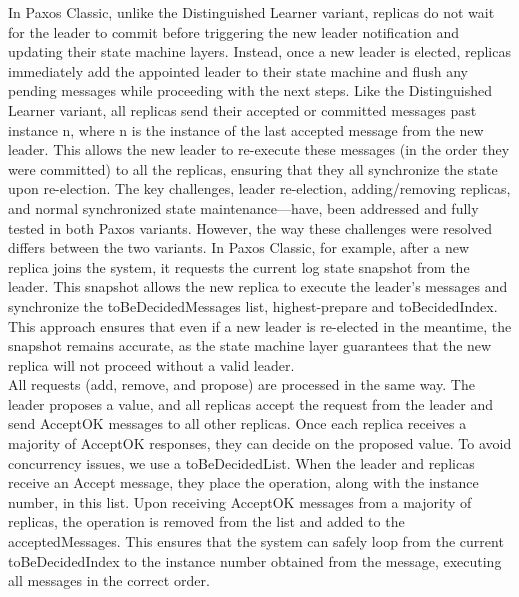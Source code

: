 \documentclass[sigconf]{acmart}
\begin{document}
In Paxos Classic, unlike the Distinguished Learner variant, replicas do not wait for the leader to commit before triggering the new leader notification and updating their state machine layers. Instead, once a new leader is elected, replicas immediately add the appointed leader to their state machine and flush any pending messages while proceeding with the next steps. Like the Distinguished Learner variant, all replicas send their accepted or committed messages past instance n, where n is the instance of the last accepted message from the new leader. This allows the new leader to re-execute these messages (in the order they were committed) to all the replicas, ensuring that they all synchronize the state upon re-election.
The key challenges, leader re-election, adding/removing replicas, and normal synchronized state maintenance—have, been addressed and fully tested in both Paxos variants. However, the way these challenges were resolved differs between the two variants. In Paxos Classic, for example, after a new replica joins the system, it requests the current log state snapshot from the leader. This snapshot allows the new replica to execute the leader’s messages and synchronize the toBeDecidedMessages list, highest-prepare and toBecidedIndex. This approach ensures that even if a new leader is re-elected in the meantime, the snapshot remains accurate, as the state machine layer guarantees that the new replica will not proceed without a valid leader.\\
All requests (add, remove, and propose) are processed in the same way. The leader proposes a value, and all replicas accept the request from the leader and send AcceptOK messages to all other replicas. Once each replica receives a majority of AcceptOK responses, they can decide on the proposed value. To avoid concurrency issues, we use a toBeDecidedList. When the leader and replicas receive an Accept message, they place the operation, along with the instance number, in this list. Upon receiving AcceptOK messages from a majority of replicas, the operation is removed from the list and added to the acceptedMessages. This ensures that the system can safely loop from the current toBeDecidedIndex to the instance number obtained from the message, executing all messages in the correct order.
\end{document}
